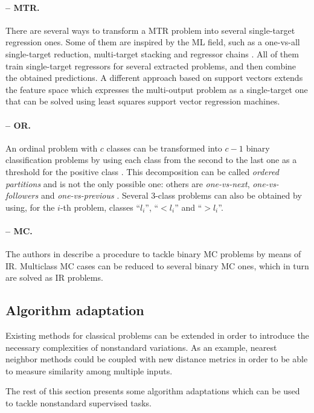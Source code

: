 \documentclass[
	fontsize=11pt, %
	twoside=false, %
	open=any, %
	secnumdepth=1, %
]{kaobook}
\begin{document}
\paragraph{-- MTR.} There are several ways to transform a MTR problem into several single-target regression ones. Some of them are inspired by the ML field, such as a one-vs-all single-target reduction, multi-target stacking and regressor chains \cite{mtrviaml}. All of them train single-target regressors for several extracted problems, and then combine the obtained predictions. A different approach based on support vectors \cite{mtr-lssvr} extends the feature space which expresses the multi-output problem as a single-target one that can be solved using least squares support vector regression machines.

\paragraph{-- OR.} An ordinal problem with $c$ classes can be transformed into $c-1$ binary classification problems by using each class from the second to the last one as a threshold for the positive class \cite{ord-simple}. This decomposition can be called \emph{ordered partitions} and is not the only possible one: others are \emph{one-vs-next}, \emph{one-vs-followers} and \emph{one-vs-previous} \cite{ord-survey}. Several 3-class problems can also be obtained by using, for the $i$-th problem, classes ``$l_i$'', ``$<l_i$'' and ``$>l_i$''.

\paragraph{-- MC.} The authors in \cite{monotonicity} describe a procedure to tackle binary MC problems by means of IR. Multiclass MC cases can be reduced to several binary MC ones, which in turn are solved as IR problems. 

\subsection{Algorithm adaptation}

Existing methods for classical problems can be extended in order to introduce the necessary complexities of nonstandard variations. As an example, nearest neighbor methods could be coupled with new distance metrics in order to be able to measure similarity among multiple inputs.

The rest of this section presents some algorithm adaptations which can be used to tackle nonstandard supervised tasks.
\end{document}
